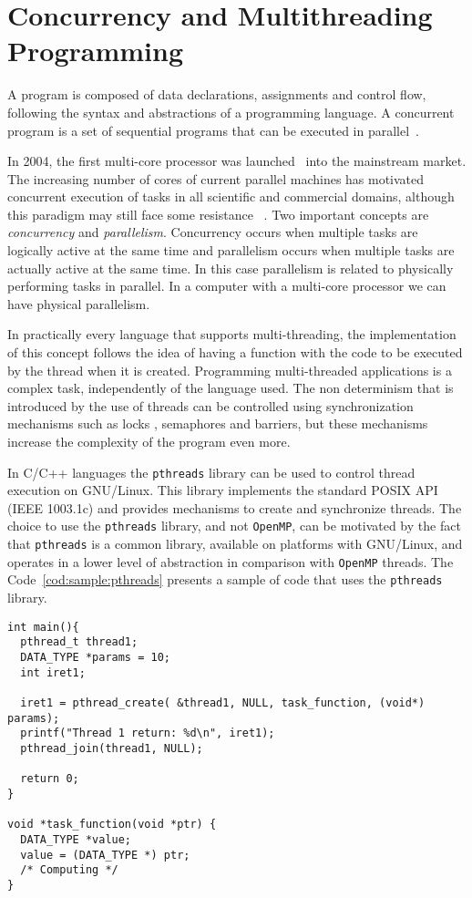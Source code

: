 \section{Concurrency and Multithreading Programming}
\label{sec:concurrency}

A program is composed of data declarations, assignments and control flow, following the syntax and abstractions of a programming language. A concurrent program is a set of sequential programs that can be executed in parallel~\cite{Ben-Ari:1990}.

In 2004, the first multi-core processor was launched~\cite{Sutter:2005} into the mainstream market. The increasing number of cores of current parallel machines has motivated concurrent execution of tasks in all scientific and commercial domains, although this paradigm may still face some resistance~\cite{FreeLunchIsOver} \cite{threadsProblem:2006} \cite{KISS:2004:article}. Two important concepts are \emph{concurrency} and \emph{parallelism}. Concurrency occurs when multiple tasks are logically active at the same time and parallelism occurs when multiple tasks are actually active at the same time. In this case parallelism is related to physically performing tasks in parallel. In a computer with a multi-core processor we can have physical parallelism.

In practically every language that supports multi-threading, the implementation of this concept follows the idea of having a function with the code to be executed by the thread when it is created. Programming multi-threaded applications is a complex task, independently of the language used. The non determinism that is introduced by the use of threads can be controlled using synchronization mechanisms such as locks \cite{threadsProblem:2006}, semaphores and barriers, but these mechanisms increase the complexity of the program even more. 

In C/C++ languages the \texttt{pthreads} library can be used to control thread execution on GNU/Linux. This library implements the standard POSIX API (IEEE 1003.1c) and provides mechanisms to create and synchronize threads. The choice to use the \texttt{pthreads} library, and not \texttt{OpenMP}, can be motivated by the fact that \texttt{pthreads} is a common library, available on platforms with GNU/Linux, and operates in a lower level of abstraction in comparison with \texttt{OpenMP} threads. The Code~\ref{cod:sample:pthreads} presents a sample of code that uses the \texttt{pthreads} library.

\begin{lstlisting}[style=C, label=cod:sample:pthreads,caption=The Sample of pthreads code.]
int main(){
  pthread_t thread1;
  DATA_TYPE *params = 10;
  int iret1;

  iret1 = pthread_create( &thread1, NULL, task_function, (void*) params);
  printf("Thread 1 return: %d\n", iret1);
  pthread_join(thread1, NULL);
  
  return 0;
}

void *task_function(void *ptr) {
  DATA_TYPE *value;
  value = (DATA_TYPE *) ptr;
  /* Computing */
}
\end{lstlisting}

